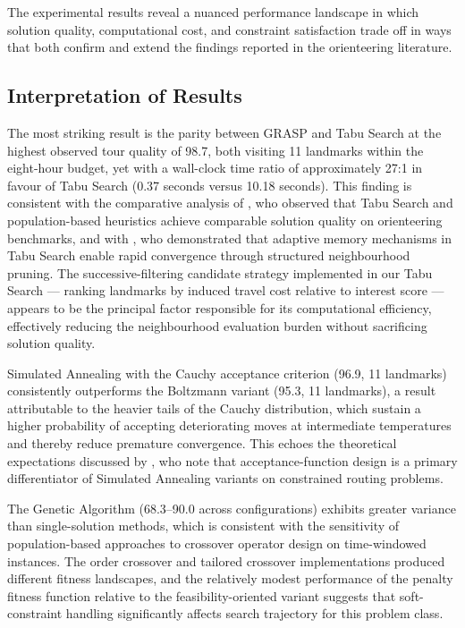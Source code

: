 
The experimental results reveal a nuanced performance landscape in
which solution quality, computational cost, and constraint
satisfaction trade off in ways that both confirm and extend the
findings reported in the orienteering literature.

\subsection{Interpretation of Results}

The most striking result is the parity between GRASP and Tabu
Search at the highest observed tour quality of 98.7, both visiting
11 landmarks within the eight-hour budget, yet with a wall-clock
time ratio of approximately 27:1 in favour of Tabu Search (0.37
seconds versus 10.18 seconds). This finding is consistent with the
comparative analysis of \textcite{Liang2002}, who observed that
Tabu Search and population-based heuristics achieve comparable
solution quality on orienteering benchmarks, and with
\textcite{Tang2005}, who demonstrated that adaptive memory
mechanisms in Tabu Search enable rapid convergence through
structured neighbourhood pruning. The successive-filtering
candidate strategy implemented in our Tabu Search --- ranking
landmarks by induced travel cost relative to interest score ---
appears to be the principal factor responsible for its
computational efficiency, effectively reducing the neighbourhood
evaluation burden without sacrificing solution quality.

Simulated Annealing with the Cauchy acceptance criterion (96.9,
11 landmarks) consistently outperforms the Boltzmann variant
(95.3, 11 landmarks), a result attributable to the heavier tails
of the Cauchy distribution, which sustain a higher probability of
accepting deteriorating moves at intermediate temperatures and
thereby reduce premature convergence. This echoes the theoretical
expectations discussed by \textcite{Gunawan2016}, who note that
acceptance-function design is a primary differentiator of
Simulated Annealing variants on constrained routing problems.

The Genetic Algorithm (68.3--90.0 across configurations) exhibits
greater variance than single-solution methods, which is consistent
with the sensitivity of population-based approaches to crossover
operator design on time-windowed instances. The order crossover
and tailored crossover implementations produced different fitness
landscapes, and the relatively modest performance of the penalty
fitness function relative to the feasibility-oriented variant
suggests that soft-constraint handling significantly affects
search trajectory for this problem class.

